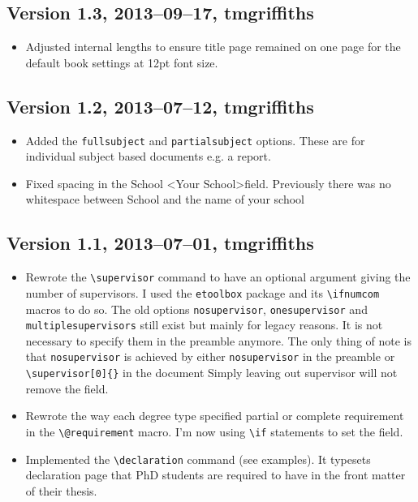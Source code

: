 \documentclass[12pt,oneside]{article}
\newcommand{\option}[1]{\texttt{\color{Green}#1}} %
\newcommand{\command}[1]{\texttt{\color{Red}#1}} %
\newcommand{\comoptions}[1]{\texttt{\color{Blue}#1}} %
\begin{document}
\subsection*{Version 1.3, 2013–09–17, tmgriffiths}
\begin{itemize}
    \item Adjusted internal lengths to ensure title page remained on one page for the default book settings at 12pt font size.
\end{itemize}

\subsection*{Version 1.2, 2013–07–12, tmgriffiths}
\begin{itemize}
    \item Added the \option{fullsubject} and \option{partialsubject} options. These are for individual subject based documents e.g. a report.
    \item Fixed spacing in the School \textless{}Your School\textgreater field. Previously there was no whitespace between School and the name of your school
\end{itemize}    
\subsection*{Version 1.1, 2013–07–01, tmgriffiths}
\begin{itemize}
    \item Rewrote the \command{\textbackslash{}supervisor} command to have an optional argument giving the number of supervisors. I used the \texttt{etoolbox} package and its \texttt{\textbackslash{}ifnumcom} macros to do so. The old options \option{nosupervisor}, \option{onesupervisor} and \option{multiplesupervisors} still exist but mainly for legacy reasons. It is not necessary to specify them in the preamble anymore. The only thing of note is that \option{nosupervisor} is achieved by either \option{nosupervisor} in the preamble or \command{\textbackslash{}supervisor}\comoptions{\texttt{[0]\{\}}} in the document Simply leaving out supervisor will not remove the field.
    \item Rewrote the way each degree type specified partial or complete requirement in the \command{\textbackslash{}@requirement} macro. I'm now using \texttt{\textbackslash{}if} statements to set the field.
    \item Implemented the \command{\textbackslash{}declaration} command (see examples). It typesets declaration page that PhD students are required to have in the front matter of their thesis.
\end{itemize}
\end{document}
